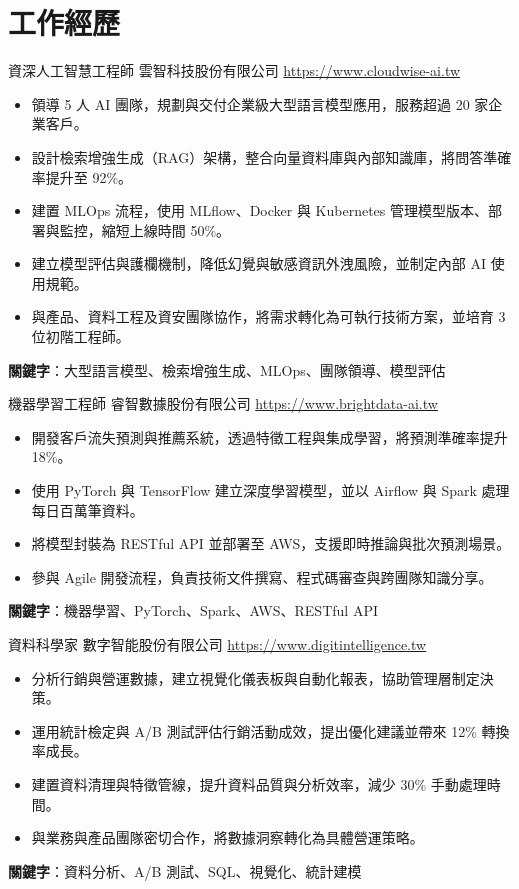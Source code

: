 \documentclass[a4paper, serif, 10pt]{moderncv}
\begin{document}
\section{工作經歷}

        {資深人工智慧工程師}
        {雲智科技股份有限公司}
        {\url{https://www.cloudwise-ai.tw}}
        {}
        {\begin{itemize}
\item 領導 5 人 AI 團隊，規劃與交付企業級大型語言模型應用，服務超過 20 家企業客戶。
\item 設計檢索增強生成（RAG）架構，整合向量資料庫與內部知識庫，將問答準確率提升至 92\%。
\item 建置 MLOps 流程，使用 MLflow、Docker 與 Kubernetes 管理模型版本、部署與監控，縮短上線時間 50\%。
\item 建立模型評估與護欄機制，降低幻覺與敏感資訊外洩風險，並制定內部 AI 使用規範。
\item 與產品、資料工程及資安團隊協作，將需求轉化為可執行技術方案，並培育 3 位初階工程師。
\end{itemize}
\textbf{關鍵字}：大型語言模型、檢索增強生成、MLOps、團隊領導、模型評估}

        {機器學習工程師}
        {睿智數據股份有限公司}
        {\url{https://www.brightdata-ai.tw}}
        {}
        {\begin{itemize}
\item 開發客戶流失預測與推薦系統，透過特徵工程與集成學習，將預測準確率提升 18\%。
\item 使用 PyTorch 與 TensorFlow 建立深度學習模型，並以 Airflow 與 Spark 處理每日百萬筆資料。
\item 將模型封裝為 RESTful API 並部署至 AWS，支援即時推論與批次預測場景。
\item 參與 Agile 開發流程，負責技術文件撰寫、程式碼審查與跨團隊知識分享。
\end{itemize}
\textbf{關鍵字}：機器學習、PyTorch、Spark、AWS、RESTful API}

        {資料科學家}
        {數字智能股份有限公司}
        {\url{https://www.digitintelligence.tw}}
        {}
        {\begin{itemize}
\item 分析行銷與營運數據，建立視覺化儀表板與自動化報表，協助管理層制定決策。
\item 運用統計檢定與 A/B 測試評估行銷活動成效，提出優化建議並帶來 12\% 轉換率成長。
\item 建置資料清理與特徵管線，提升資料品質與分析效率，減少 30\% 手動處理時間。
\item 與業務與產品團隊密切合作，將數據洞察轉化為具體營運策略。
\end{itemize}
\textbf{關鍵字}：資料分析、A/B 測試、SQL、視覺化、統計建模}
\end{document}
